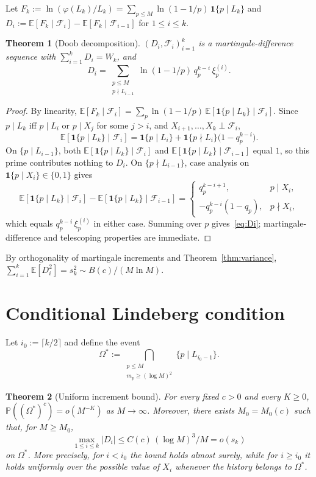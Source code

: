 \documentclass[11pt]{article}
\newtheorem{theorem}{Theorem}
\theoremstyle{remark}
\newcommand{\PP}{\mathbb{P}}
\newcommand{\EE}{\mathbb{E}}
\newcommand{\F}{\mathcal{F}}
\newcommand{\one}{\mathbf{1}}
\begin{document}
Let $F_k := \ln(\varphi(L_k)/L_k) = \sum_{p \leq M} \ln(1 - 1/p)\, \one\{p \mid L_k\}$ and $D_i := \EE[F_k \mid \F_i] - \EE[F_k \mid \F_{i-1}]$ for $1 \leq i \leq k$.

\begin{theorem}[Doob decomposition]\label{thm:doob}
$(D_i, \F_i)_{i=1}^k$ is a martingale-difference sequence with $\sum_{i=1}^k D_i = W_k$, and
\begin{equation}\label{eq:Di}
D_i = \sum_{\substack{p \leq M \\ p \nmid L_{i-1}}} \ln(1 - 1/p)\, q_p^{k-i}\, \xi_p^{(i)}.
\end{equation}
\end{theorem}

\begin{proof}
By linearity, $\EE[F_k \mid \F_i] = \sum_p \ln(1 - 1/p)\, \EE[\one\{p \mid L_k\} \mid \F_i]$. Since $p \mid L_k$ iff $p \mid L_i$ or $p \mid X_j$ for some $j > i$, and $X_{i+1}, \ldots, X_k \perp \F_i$,
\[
\EE[\one\{p \mid L_k\} \mid \F_i] = \one\{p \mid L_i\} + \one\{p \nmid L_i\}\bigl(1 - q_p^{k-i}\bigr).
\]
On $\{p \mid L_{i-1}\}$, both $\EE[\one\{p \mid L_k\} \mid \F_i]$ and $\EE[\one\{p \mid L_k\} \mid \F_{i-1}]$ equal $1$, so this prime contributes nothing to $D_i$. On $\{p \nmid L_{i-1}\}$, case analysis on $\one\{p \mid X_i\} \in \{0, 1\}$ gives
\[
\EE[\one\{p \mid L_k\} \mid \F_i] - \EE[\one\{p \mid L_k\} \mid \F_{i-1}] = \begin{cases} q_p^{k-i+1}, & p \mid X_i, \\ -q_p^{k-i}(1 - q_p), & p \nmid X_i, \end{cases}
\]
which equals $q_p^{k-i}\, \xi_p^{(i)}$ in either case. Summing over $p$ gives~\eqref{eq:Di}; martingale-difference and telescoping properties are immediate.
\end{proof}

By orthogonality of martingale increments and Theorem~\ref{thm:variance}, $\sum_{i=1}^k \EE[D_i^2] = s_k^2 \sim B(c)/(M \ln M)$.

\section{Conditional Lindeberg condition}\label{sec:lindeberg}

Let $i_0 := \lceil k/2\rceil$ and define the event
\[
\Omega^* := \bigcap_{\substack{p \leq M \\ m_p \geq (\log M)^2}} \{p \mid L_{i_0-1}\}.
\]

\begin{theorem}[Uniform increment bound]\label{thm:supnorm}
For every fixed $c > 0$ and every $K \geq 0$, $\PP((\Omega^*)^c) = o(M^{-K})$ as $M \to \infty$. Moreover, there exists $M_0 = M_0(c)$ such that, for $M \geq M_0$,
\begin{equation}\label{eq:supnorm}
\max_{1 \leq i \leq k}|D_i| \leq C(c)\,(\log M)^3/M = o(s_k)
\end{equation}
on $\Omega^*$. More precisely, for $i < i_0$ the bound holds almost surely, while for $i \geq i_0$ it holds uniformly over the possible value of $X_i$ whenever the history belongs to $\Omega^*$.
\end{theorem}
\end{document}
